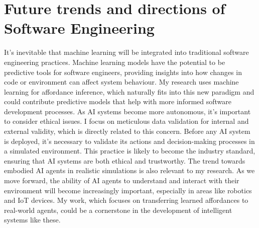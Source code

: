 \documentclass[11pt]{article}
\begin{document}
\section{Future trends and directions of Software Engineering}
It's inevitable that machine learning will be integrated into traditional software engineering practices. Machine learning models have the potential to be predictive tools for software engineers, providing insights into how changes in code or environment can affect system behaviour. My research uses machine learning for affordance inference, which naturally fits into this new paradigm and could contribute predictive models that help with more informed software development processes. 
As AI systems become more autonomous, it's important to consider ethical issues. I focus on meticulous data validation for internal and external validity, which is directly related to this concern. Before any AI system is deployed, it's necessary to validate its actions and decision-making processes in a simulated environment. This practice is likely to become the industry standard, ensuring that AI systems are both ethical and trustworthy. 
The trend towards embodied AI agents in realistic simulations is also relevant to my research. As we move forward, the ability of AI agents to understand and interact with their environment will become increasingly important, especially in areas like robotics and IoT devices. My work, which focuses on transferring learned affordances to real-world agents, could be a cornerstone in the development of intelligent systems like these.
\printbibliography[]
\end{document}
